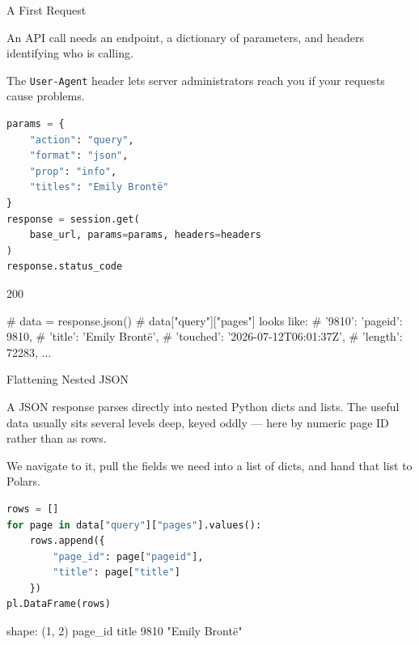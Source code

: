 \documentclass[8pt,aspectratio=169]{beamer}
\begin{document}
\begin{frame}[fragile]{A First Request}
\begin{splitcode}{%

An API call needs an endpoint, a dictionary of parameters, and headers identifying who is calling.

The \texttt{User-Agent} header lets server administrators reach you if your requests cause problems.

}
\begin{lstlisting}[language=Python]
params = {
    "action": "query",
    "format": "json",
    "prop": "info",
    "titles": "Emily Brontë"
}
response = session.get(
    base_url, params=params, headers=headers
)
response.status_code
\end{lstlisting}
\begin{codeoutput}
200

# data = response.json()
# data["query"]["pages"] looks like:
# {'9810': {'pageid': 9810,
#   'title': 'Emily Brontë',
#   'touched': '2026-07-12T06:01:37Z',
#   'length': 72283, ...}}
\end{codeoutput}
\end{splitcode}
\end{frame}

\begin{frame}[fragile]{Flattening Nested JSON}
\begin{splitcode}{%

A JSON response parses directly into nested Python dicts and lists. The useful data usually sits several levels deep, keyed oddly --- here by numeric page ID rather than as rows.

We navigate to it, pull the fields we need into a list of dicts, and hand that list to Polars.

}
\begin{lstlisting}[language=Python]
rows = []
for page in data["query"]["pages"].values():
    rows.append({
        "page_id": page["pageid"],
        "title": page["title"]
    })
pl.DataFrame(rows)
\end{lstlisting}
\begin{codeoutput}
shape: (1, 2)
page_id  title
9810     "Emily Brontë"
\end{codeoutput}
\end{splitcode}
\end{frame}
\end{document}
